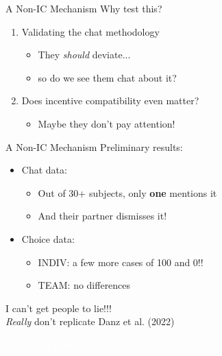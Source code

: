 \begin{frame}{A Non-IC Mechanism}
Why test this?
\begin{enumerate}
    \item Validating the chat methodology
    \begin{itemize}
        \item They \textit{should} deviate...
        \item so do we see them chat about it?
    \end{itemize}
    \item Does incentive compatibility even matter?
    \begin{itemize}
        \item Maybe they don't pay attention!
    \end{itemize}
\end{enumerate}    
\end{frame}

\begin{frame}{A Non-IC Mechanism}
Preliminary results:
\begin{itemize}
    \item Chat data:
    \begin{itemize}
        \item Out of 30+ subjects, only \textbf{one} mentions it
        \item And their partner dismisses it!
    \end{itemize}
    \item Choice data:
    \begin{itemize}
        \item INDIV: a few more cases of 100 and 0!!
        \item TEAM: no differences
    \end{itemize}
\end{itemize}
I can't get people to lie!!!\\
\textit{Really} don't replicate Danz et al. (2022)
\end{frame}

\begin{transitionframe}
    \vfill
  \begin{center}{ \Huge \textcolor{white}{Tangential Results}}\end{center}
  \vfill
\end{transitionframe}

